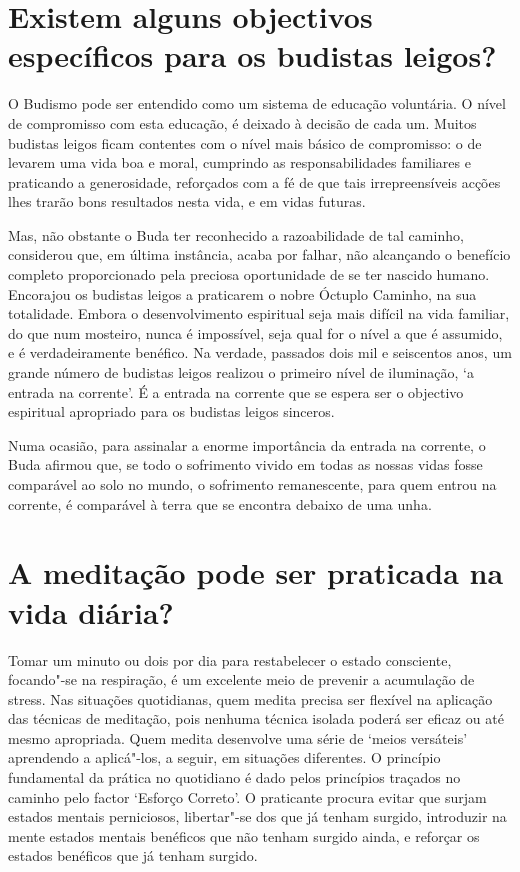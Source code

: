 \section{Existem alguns objectivos específicos para os budistas leigos?}

O Budismo pode ser entendido como um sistema de educação voluntária. O
nível de compromisso com esta educação, é deixado à decisão de cada um.
Muitos budistas leigos ficam contentes com o nível mais básico de
compromisso: o de levarem uma vida boa e moral, cumprindo as
responsabilidades familiares e praticando a generosidade, reforçados com
a fé de que tais irrepreensíveis acções lhes trarão bons resultados
nesta vida, e em vidas futuras.

Mas, não obstante o Buda ter reconhecido a razoabilidade de tal caminho,
considerou que, em última instância, acaba por falhar, não alcançando o
benefício completo proporcionado pela preciosa oportunidade de se ter
nascido humano. Encorajou os budistas leigos a praticarem o nobre
Óctuplo Caminho, na sua totalidade. Embora o desenvolvimento espiritual
seja mais difícil na vida familiar, do que num mosteiro, nunca é
impossível, seja qual for o nível a que é assumido, e é verdadeiramente
benéfico. Na verdade, passados dois mil e seiscentos anos, um grande
número de budistas leigos realizou o primeiro nível de iluminação, `a
entrada na corrente'. É a entrada na corrente que se espera ser o
objectivo espiritual apropriado para os budistas leigos sinceros.

Numa ocasião, para assinalar a enorme importância da entrada na
corrente, o Buda afirmou que, se todo o sofrimento vivido em todas as
nossas vidas fosse comparável ao solo no mundo, o sofrimento
remanescente, para quem entrou na corrente, é comparável à terra que se
encontra debaixo de uma unha.

\section{A meditação pode ser praticada na vida diária?}

Tomar um minuto ou dois por dia para restabelecer o estado consciente,
focando"-se na respiração, é um excelente meio de prevenir a acumulação
de stress. Nas situações quotidianas, quem medita precisa ser flexível
na aplicação das técnicas de meditação, pois nenhuma técnica isolada
poderá ser eficaz ou até mesmo apropriada. Quem medita desenvolve uma
série de `meios versáteis' aprendendo a aplicá"-los, a seguir, em
situações diferentes. O princípio fundamental da prática no quotidiano é
dado pelos princípios traçados no caminho pelo factor `Esforço
Correto'. O praticante procura evitar que surjam estados mentais
perniciosos, libertar"-se dos que já tenham surgido, introduzir na mente
estados mentais benéficos que não tenham surgido ainda, e reforçar os
estados benéficos que já tenham surgido.
